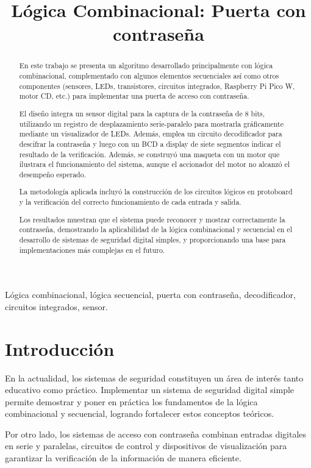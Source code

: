 \documentclass[conference]{IEEEtran}  %
\title{Lógica Combinacional: Puerta con contraseña}
\author{
    \IEEEauthorblockA{Instituto Tecnológico de Costa Rica\\
    Escuela de Ingeniería en Computadores\\
    CE1107 — Fundamentos de Arquitectura de Computadores\\}
    \IEEEauthorblockN{\\Autores: \\ Jafet José Diaz Morales - 2023053249 \\ Esteban Campos - Carnet}
}
\begin{document}
\maketitle

\begin{abstract}
En este trabajo se presenta un algoritmo desarrollado principalmente con lógica combinacional, complementado con algunos elementos secuenciales así como otros componentes (sensores, LEDs, transistores, circuitos integrados, Raspberry Pi Pico W, motor CD, etc.) para implementar una puerta de acceso con contraseña. 

El diseño integra un sensor digital para la captura de la contraseña de 8 bits, utilizando un registro de desplazamiento serie-paralelo para mostrarla gráficamente mediante un visualizador de LEDs. Además, emplea un circuito decodificador para descifrar la contraseña y luego con un BCD a display de siete segmentos indicar el resultado de la verificación. Además, se construyó una maqueta con un motor que ilustrara el funcionamiento del sistema, aunque el accionador del motor no alcanzó el desempeño esperado. 

La metodología aplicada incluyó la construcción de los circuitos lógicos en protoboard y la verificación del correcto funcionamiento de cada entrada y salida. 

Los resultados muestran que el sistema puede reconocer y mostrar correctamente la contraseña, demostrando la aplicabilidad de la lógica combinacional y secuencial en el desarrollo de sistemas de seguridad digital simples, y proporcionando una base para implementaciones más complejas en el futuro.
\end{abstract}


\begin{IEEEkeywords}
Lógica combinacional, lógica secuencial, puerta con contraseña, decodificador, circuitos integrados, sensor.
\end{IEEEkeywords}

\section{Introducción}
En la actualidad, los sistemas de seguridad constituyen un área de interés tanto educativo como práctico. Implementar un sistema de seguridad digital simple permite demostrar y poner en práctica los fundamentos de la lógica combinacional y secuencial, logrando fortalecer estos conceptos teóricos. 

Por otro lado, los sistemas de acceso con contraseña combinan entradas digitales en serie y paralelas, circuitos de control y dispositivos de visualización para garantizar la verificación de la información de manera eficiente.
\end{document}
